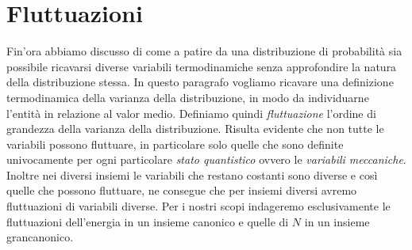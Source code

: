 \documentclass[oneside]{amsbook}
\numberwithin{section}{chapter}
\numberwithin{equation}{section}
\numberwithin{figure}{section}
\begin{document}
\section{Fluttuazioni}
Fin'ora abbiamo discusso di come a patire da una distribuzione di probabilità sia possibile ricavarsi diverse variabili termodinamiche senza approfondire la natura della distribuzione stessa. In questo paragrafo vogliamo ricavare una definizione termodinamica della varianza della distribuzione, in modo da individuarne l'entità in relazione al valor medio.
Definiamo quindi \emph{fluttuazione} l'ordine di grandezza della varianza della distribuzione.
Risulta evidente che non tutte le variabili possono fluttuare, in particolare solo quelle che sono definite univocamente per ogni particolare \emph{stato quantistico} ovvero le \emph{variabili meccaniche}. Inoltre nei diversi insiemi le variabili che restano costanti sono diverse e così quelle che possono fluttuare, ne consegue che per insiemi diversi avremo fluttuazioni di variabili diverse.
Per i nostri scopi indageremo esclusivamente le fluttuazioni dell'energia in un insieme canonico e quelle di $N$ in un insieme grancanonico.
\end{document}
